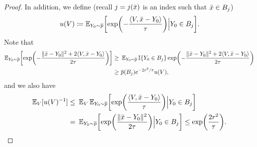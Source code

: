 \begin{proof}
In addition, we define (recall $j=j(\bar{x})$ is an index such that $\bar{x}\in B_j$)
\begin{align*}
    u(V)\deq \En_{Y_0\sim \pbar} \brk*{ \exp\prn*{-\frac{\tri{V,\xbar-Y_0}}{\tau}} \Big| Y_0\in B_j}.
\end{align*}
Note that
\begin{align*}
    \En_{Y_0\sim \pbar}\brk*{ \exp\prn*{-\frac{\nrm{\xbar-Y_0}^2+2\tri{V,\xbar-Y_0}}{2\tau}} }
    \geq&~ \En_{Y_0\sim \pbar} \indic\crl{Y_0\in B_j} \exp\prn*{-\frac{\nrm{\xbar-Y_0}^2+2\tri{V,\xbar-Y_0}}{2\tau}} \\
    \geq&~ \pbar(B_j)e^{-2r^2/\tau} u(V),
\end{align*}
and we also have
\begin{align*}
    \En_V[u(V)^{-1}]
    \leq&~ \En_V \En_{Y_0\sim \pbar} \brk*{ \exp\prn*{\frac{\tri{V,\xbar-Y_0}}{\tau}} \Big| Y_0\in B_j} \\
    =&~ \En_{Y_0\sim \pbar} \brk*{ \exp\prn*{\frac{\nrm{\xbar-Y_0}^2}{2\tau}} \Big| Y_0\in B_j}
    \leq \exp\prn*{\frac{2 r^2}{\tau}}.
\end{align*}


\end{proof}
